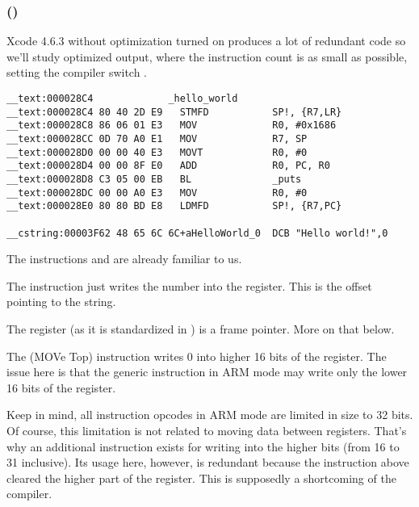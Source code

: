 \subsubsection{\OptimizingXcodeIV (\ARMMode)}

Xcode 4.6.3 without optimization turned on produces a lot of redundant code so we'll study optimized output, where the instruction count is as small as possible, setting the compiler switch \Othree.

\begin{lstlisting}[caption=\OptimizingXcodeIV (\ARMMode),style=customasmARM]
__text:000028C4             _hello_world
__text:000028C4 80 40 2D E9   STMFD           SP!, {R7,LR}
__text:000028C8 86 06 01 E3   MOV             R0, #0x1686
__text:000028CC 0D 70 A0 E1   MOV             R7, SP
__text:000028D0 00 00 40 E3   MOVT            R0, #0
__text:000028D4 00 00 8F E0   ADD             R0, PC, R0
__text:000028D8 C3 05 00 EB   BL              _puts
__text:000028DC 00 00 A0 E3   MOV             R0, #0
__text:000028E0 80 80 BD E8   LDMFD           SP!, {R7,PC}

__cstring:00003F62 48 65 6C 6C+aHelloWorld_0  DCB "Hello world!",0
\end{lstlisting}

The instructions  and  are already familiar to us.


The \MOV instruction just writes the number  into the  register.
This is the offset pointing to the  string.

The  register (as it is standardized in \IOSABI) is a frame pointer. More on that below.

The  (MOVe Top) instruction writes 0 into higher 16 bits of the register.
The issue here is that the generic \MOV instruction in ARM mode may write only the lower 16 bits of the register.

Keep in mind, all instruction opcodes in ARM mode are limited in size to 32 bits. Of course, this limitation is not related to moving data between registers.
That's why an additional instruction  exists for writing into the higher bits (from 16 to 31 inclusive).
Its usage here, however, is redundant because the  instruction above cleared the higher part of the register.
This is supposedly a shortcoming of the compiler.

